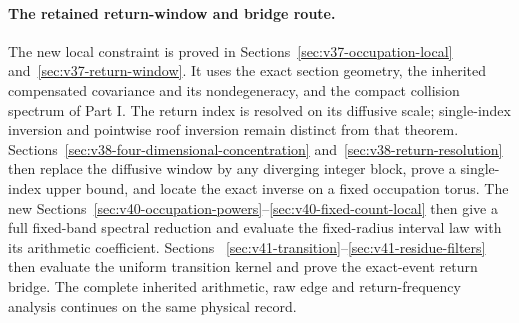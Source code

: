 \documentclass[11pt,reqno]{amsart}
\numberwithin{equation}{section}
\theoremstyle{definition}\newtheorem{definition}[theorem]{Definition}
\theoremstyle{remark}\newtheorem{remark}[theorem]{Remark}
\begin{document}
\paragraph{The retained return-window and bridge route.}
The new local constraint is proved in
Sections~\ref{sec:v37-occupation-local} and~\ref{sec:v37-return-window}.
It uses the exact section geometry, the inherited compensated
covariance and its nondegeneracy, and the compact collision spectrum
of Part I. The return index is resolved on its diffusive scale;
single-index inversion and pointwise roof inversion remain distinct
from that theorem. Sections~\ref{sec:v38-four-dimensional-concentration}
and~\ref{sec:v38-return-resolution} then replace the diffusive window
by any diverging integer block, prove a single-index upper bound, and
locate the exact inverse on a fixed occupation torus. The new
Sections~\ref{sec:v40-occupation-powers}--\ref{sec:v40-fixed-count-local}
then give a full fixed-band spectral reduction and evaluate the
fixed-radius interval law with its arithmetic coefficient. Sections~
\ref{sec:v41-transition}--\ref{sec:v41-residue-filters} then evaluate
the uniform transition kernel and prove the exact-event return bridge. The
complete inherited arithmetic, raw edge and return-frequency analysis
continues on the same physical record.

















\end{document}
